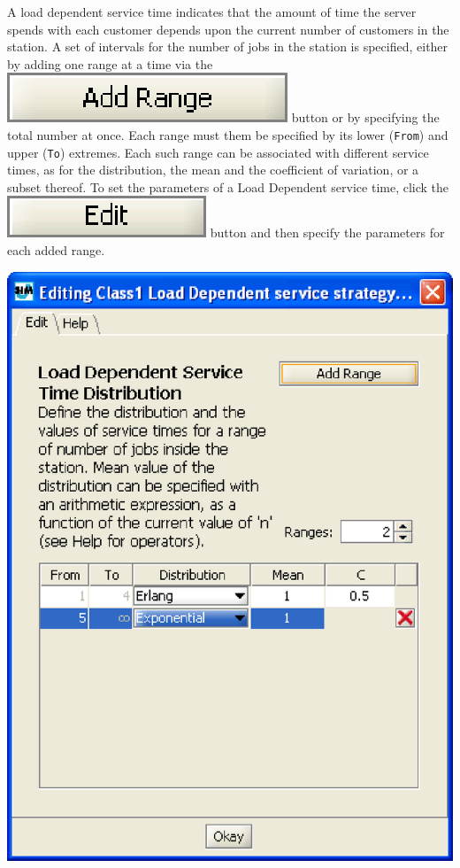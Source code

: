 A load dependent service time indicates that the amount of time
the server spends with each customer depends upon the current
number of customers in the station. A set of intervals for the
number of jobs in the station is specified, either by adding one
range at a time via the
\includegraphics[scale=.5]{img/jsim/add_range.eps} button or by
specifying the total number at once. Each range must them be
specified by its lower (\texttt{From}) and upper (\texttt{To})
extremes. Each such range can be associated with different service
times, as for the distribution, the mean and the coefficient of
variation, or a subset thereof. To set the parameters of a Load
Dependent service time, click the
\includegraphics[scale=.5]{img/jsim/edit.eps} button and then
specify the parameters for each added range.
\begin{center}
\includegraphics[scale=.5]{img/jsim/load_dipendent.eps}
\end{center}
